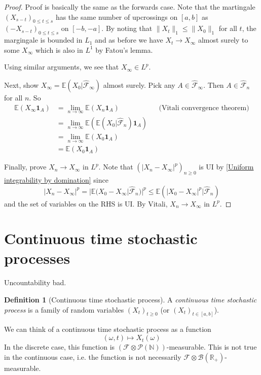 \documentclass[parskip=full]{article}
\theoremstyle{definition}
\newtheorem*{definition}{Definition}
\newcommand{\R}{\mathbb{R}}
\newcommand{\N}{\mathbb{N}}
\newcommand{\1}{\mathbbm{1}}
\newcommand{\E}{\mathbb{E}}
\begin{document}
\begin{proof}
  Proof is basically the same as the forwards case. Note that the martingale $(X_{s - t})_{0 \leq t \leq s}$ has the same number of upcrossings on $[a, b]$ as $(-X_{s - t})_{0 \leq t \leq s}$ on $[-b, -a]$. By noting that $\|X_t\|_1 \leq \|X_0\|_1$ for all $t$, the margingale is bounded in $L_1$ and as before we have $X_t \to X_\infty$ almost surely to some $X_\infty$ which is also in $L^1$ by Fatou's lemma.

  Using similar arguments, we see that $X_\infty \in L^p$.

  Next, show $X_\infty = \E(X_0 | \hat{\mathcal{F}}_\infty)$ almost surely. Pick any $A \in \hat{\mathcal{F}}_\infty$. Then $A \in \hat{\mathcal{F}}_n$ for all $n$. So
  \begin{align*}
    \E(X_\infty \mathbf{1}_A) &= \lim_{n \to \infty} \E(X_n \mathbf{1}_A) && \text{(Vitali convergence theorem)} \\
                              &= \lim_{n \to \infty} \E(\E(X_0 | \hat{\mathcal{F}}_n) \mathbf{1}_A) \\
                              &= \lim_{n \to \infty} \E(X_0 \mathbf{1}_A) \\
                              &= \E(X_0 \mathbf{1}_A)
  \end{align*}

  Finally, prove $X_n \to X_\infty$ in $L^p$. Note that $(|X_n - X_\infty|^p)_{n \geq 0}$ is UI by \ref{Uniform integrability by domination} since
  \[
    |X_n - X_\infty|^p = |\E(X_0 - X_\infty | \hat{\mathcal{F}}_n)|^p \leq \E(|X_0 - X_\infty|^p | \hat{\mathcal{F}}_n)
  \]
  and the set of variables on the RHS is UI. By Vitali, $X_n \to X_\infty$ in $L^p$.
\end{proof}

\section{Continuous time stochastic processes}
Uncountability bad.
\begin{definition}[Continuous time stochastic process]
  A \emph{continuous time stochastic process} is a family of random variables $(X_t)_{t \geq 0}$ (or $(X_t)_{t \in [a, b]}$).
\end{definition}

We can think of a continuous time stochastic process as a function
\[
  (\omega, t) \mapsto X_t(\omega)
\]
In the discrete case, this function is $(\mathcal{F} \otimes \mathcal{P}(\N))$-measurable. This is not true in the continuous case, i.e. the function is not necessarily $\mathcal{F} \otimes \mathcal{B}(\R_+)$-measurable.
\end{document}
